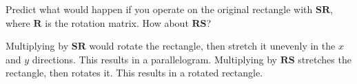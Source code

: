 Predict what would happen if you operate on the original rectangle with $\boldsymbol{SR}$, where $\boldsymbol{R}$ is the rotation matrix. How about $\boldsymbol{RS}$?

\begin{solution}
    Multiplying by $\boldsymbol{SR}$ would rotate the rectangle, then stretch it unevenly in the $x$ and $y$ directions. This results in a parallelogram. Multiplying by $\boldsymbol{RS}$ stretches the rectangle, then rotates it. This results in a rotated rectangle.
\end{solution}